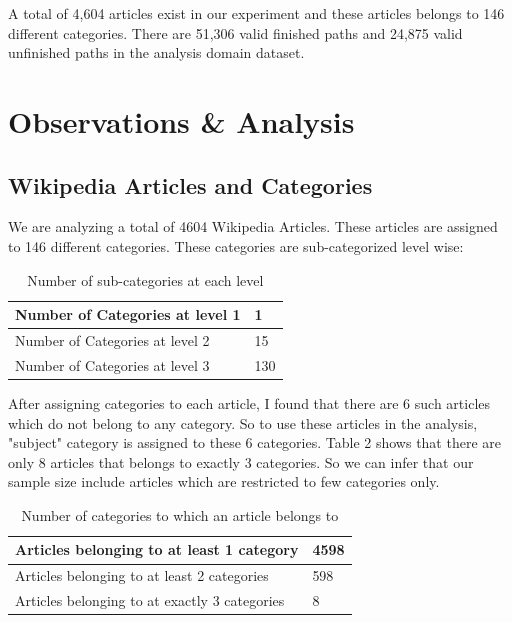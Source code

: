 \documentclass[12pt]{article}
\begin{document}
	A total of 4,604 articles exist in our experiment and these articles belongs to 146 different categories. There are 51,306 valid finished paths and 24,875 valid unfinished paths in the analysis domain dataset.
	
	\pagebreak
	\section{Observations \& Analysis} %
	
	\subsection{Wikipedia Articles and Categories}
	We are analyzing a total of 4604 Wikipedia Articles. These articles are assigned to 146 different categories. These categories are sub-categorized level wise:
	\begin{table}[h]
	\centering
	\begin{tabular}{|l|l|}
	\hline
	Number of Categories at level 1 & 1   \\ \hline
	Number of Categories at level 2 & 15  \\ \hline
	Number of Categories at level 3 & 130 \\ \hline
	\end{tabular}
	\caption{Number of sub-categories at each level}
	\end{table}
	
	After assigning categories to each article, I found that there are 6 such articles which do not belong to any category. So to use these articles in the analysis, "subject" category is assigned to these 6 categories. Table 2 shows that there are only 8 articles that belongs to exactly 3 categories. So we can infer that our sample size include articles which are restricted to few categories only.
	\begin{table}[h]
	\centering
	\begin{tabular}{|l|l|}
	\hline
	Articles belonging to at least 1 category     & 4598 \\ \hline
	Articles belonging to at least 2 categories   & 598  \\ \hline
	Articles belonging to at exactly 3 categories & 8    \\ \hline
	\end{tabular}
	\caption{Number of categories to which an article belongs to}
	\end{table}
	
\end{document}
